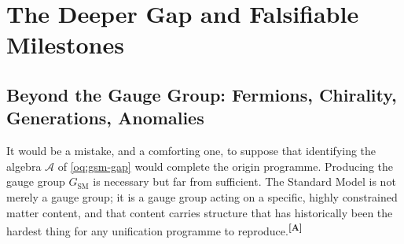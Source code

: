 \documentclass[12pt,a4paper,twoside]{article}
\theoremstyle{plain}
\theoremstyle{definition}
\theoremstyle{remark}
\newcommand{\catmark}[1]{\textsuperscript{\textsf{\textbf{[#1]}}}}
\begin{document}

\section{The Deeper Gap and Falsifiable Milestones}
\label{sec:deeper-gap-milestones}

\subsection{Beyond the Gauge Group: Fermions, Chirality, Generations, Anomalies}
\label{subsec:deeper-gap}

It would be a mistake, and a comforting one, to suppose that identifying the algebra $\mathcal{A}$ of \cref{oq:gsm-gap} would complete the origin programme. Producing the gauge group $G_{\mathrm{SM}}$ is necessary but far from sufficient. The Standard Model is not merely a gauge group; it is a gauge group acting on a specific, highly constrained matter content, and that content carries structure that has historically been the hardest thing for any unification programme to reproduce.\catmark{A}
\end{document}
